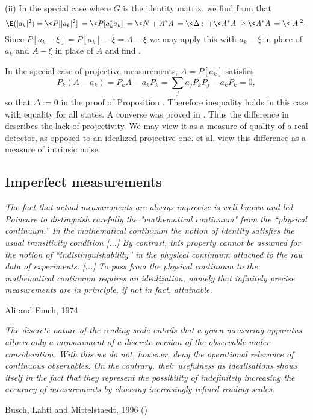\documentclass[12pt]{article}
\begin{document}
(ii) In the special case where $G$ is the identity matrix, we find from
 that
\[
\E(|a_k|^2)=\<P[|a_k|^2]\>=\<P[a_k^*a_k]\>=\<N+A^*A\>
=\<\Delta:\>+\<A^*A\>\ge \<A^*A\>=\<|A|^2\>.
\]
Since $P[a_k-\xi]=P[a_k]-\xi=A-\xi$ we may apply this with
$a_k-\xi$ in place of $a_k$ and $A-\xi$ in place of $A$ and find
.
\epf

In the special case of projective measurements, $A=P[a_k]$ satisfies
\[
P_k(A-a_k)=P_kA-a_kP_k=\sum_j a_jP_kP_j-a_kP_k=0,
\]
so that $\Delta:=0$ in the proof of Proposition .
Therefore inequality  holds in this case with equality 
for all states. A converse was proved in 
\cite[Proposition 2]{KruM}. Thus the difference in 
describes the lack of projectivity. We may view it as a measure of
quality of a real detector, as opposed to an idealized projective one.
 et al. \cite[(16)]{BusHL} view this difference as a measure
of intrinsic noise.



\subsection{Imperfect measurements}\label{ss.imp}

\nopagebreak
\hfill\parbox[t]{10.8cm}{\footnotesize

{\em
The fact that actual measurements are always imprecise is well-known
and led Poincare to distinguish carefully the "mathematical continuum"
from the ``physical continuum.'' In the mathematical continuum the notion
of identity satisfies the usual transitivity condition [...]
By contrast, this property cannot be assumed for the notion of
``indistinguishability'' in the physical continuum attached to the raw
data of experiments. [...]
To pass from the physical continuum to the mathematical continuum
requires an idealization, namely that infinitely precise measurements
are in principle, if not in fact, attainable.}

\hfill Ali and Emch, 1974 \cite[p.1545]{AliE.meas}
}

\bigskip

\nopagebreak
\hfill\parbox[t]{10.8cm}{\footnotesize

{\em The discrete nature of the reading scale entails that a given
measuring apparatus allows only a measurement of a discrete version of
the observable under consideration. With this we do not, however, deny
the operational relevance of continuous observables. On the contrary,
their usefulness as idealisations shows itself in the fact that they
represent the possibility of indefinitely increasing the accuracy of
measurements by choosing increasingly refined reading scales.
}

\hfill Busch, Lahti and Mittelstaedt, 1996 (\cite[p.81]{BusLM})
}
\end{document}
